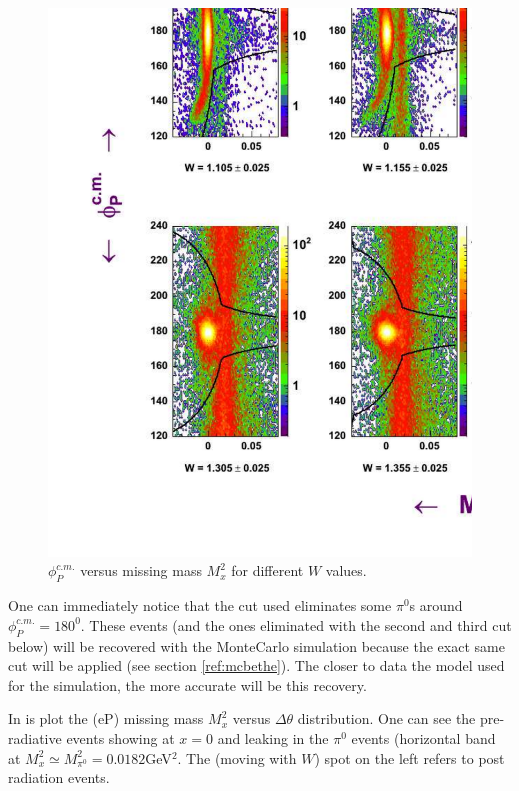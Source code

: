 \begin{figure}[h]
 \begin{center}
 \includegraphics[width = 15.2cm, bb=40 40 1220 940]{data_reduction/img/bh_phi_mm} 
  \caption[$\phi_P^{c.m.}$ versus missing mass $M_x^2$ for different $W$ values]
          { $\phi_P^{c.m.}$ versus missing mass $M_x^2$ for different $W$ values.}
 \label{fig:bh_phi_mm}
 \end{center}
\end{figure}
One can immediately notice that the cut used eliminates some $\pi^0$s around $\phi_P^{c.m.}=180^0$.
These events (and the ones eliminated with the second and third cut below) 
will be recovered with the MonteCarlo simulation because the exact same cut will
be applied (see section \ref{ref:mcbethe}). The closer to data the model used for the simulation, 
the more accurate will be this recovery.

In  is plot the (eP) missing mass $M_x^2$ versus $\Delta\theta$ distribution.
One can see the pre-radiative events showing at $x=0$ and leaking in the $\pi^0$ events
(horizontal band at $M_x^2\simeq M_{\pi^0}^2=0.0182 $GeV$^2$. The (moving with $W$) spot on the left 
refers to post radiation events.


